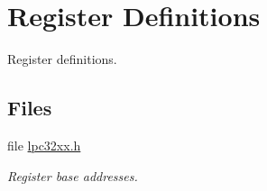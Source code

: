 \hypertarget{group__lpc32xx__reg}{}\section{Register Definitions}
\label{group__lpc32xx__reg}


Register definitions.  


\subsection*{Files}
\begin{DoxyCompactItemize}
\item 
file \mbox{\hyperlink{lpc32xx_8h}{lpc32xx.\+h}}
\begin{DoxyCompactList}\small\item\em Register base addresses. \end{DoxyCompactList}\end{DoxyCompactItemize}
